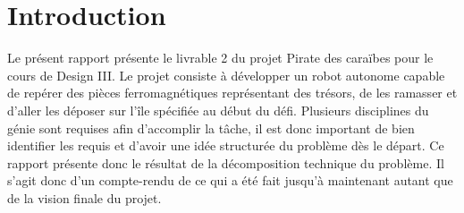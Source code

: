 \chapter{Introduction}
Le présent rapport présente le livrable 2 du projet Pirate des caraïbes pour le cours de Design III.
Le projet consiste à développer un robot autonome capable de repérer des pièces ferromagnétiques représentant des trésors,
de les ramasser et d'aller les déposer sur l'île spécifiée au début du défi. Plusieurs disciplines du génie sont requises afin d'accomplir la tâche,
il est donc important de bien identifier les requis et d'avoir une idée structurée du problème dès le départ. Ce rapport présente donc le résultat de la décomposition technique du problème.
Il s'agit donc d'un compte-rendu de ce qui a été fait jusqu'à maintenant autant que de la vision finale du projet.
